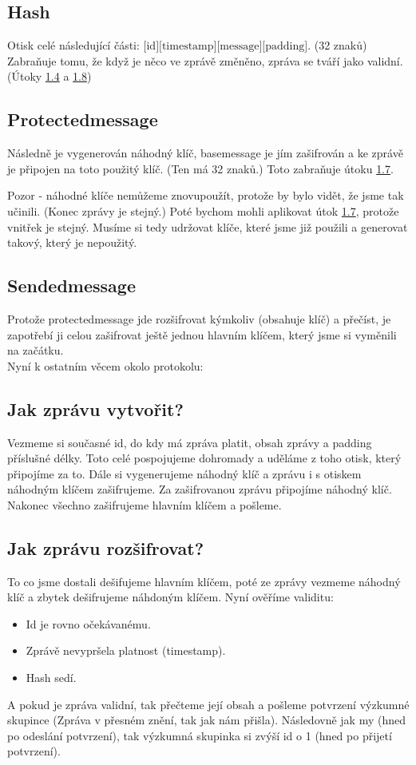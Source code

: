 \documentclass{article}
\begin{document}
\subsection{Hash}
Otisk celé následující části: \(\text{[id][timestamp][message][padding]}\). (32 znaků) Zabraňuje tomu, že když je něco ve zprávě změněno, zpráva se tváří jako validní.
(Útoky \hyperref[1.4]{1.4} a \hyperref[1.8]{1.8})

\subsection{Protectedmessage}
Následně je vygenerován náhodný klíč, basemessage je jím zašifrován a ke zprávě je připojen na toto použitý klíč. (Ten má 32 znaků.) Toto zabraňuje útoku \hyperref[1.7]{1.7}.

Pozor - náhodné klíče nemůžeme znovupoužít, protože by bylo vidět, že jsme tak učinili. (Konec zprávy je stejný.) Poté bychom mohli aplikovat útok \hyperref[1.7]{1.7}, protože vnitřek je stejný.
Musíme si tedy udržovat klíče, které jsme již použili a generovat takový, který je nepoužitý.

\subsection{Sendedmessage}
Protože protectedmessage jde rozšifrovat kýmkoliv (obsahuje klíč) a přečíst, je zapotřebí ji celou zašifrovat ještě jednou hlavním klíčem, který jsme si vyměnili na začátku. \\

Nyní k ostatním věcem okolo protokolu:
\subsection{Jak zprávu vytvořit?}
Vezmeme si současné id, do kdy má zpráva platit, obsah zprávy a padding příslušné délky. Toto celé pospojujeme dohromady a uděláme z toho otisk, který připojíme za to. Dále si vygenerujeme náhodný klíč a zprávu i s otiskem
náhodným klíčem zašifrujeme. Za zašifrovanou zprávu připojíme náhodný klíč. Nakonec všechno zašifrujeme hlavním klíčem a pošleme.

\subsection{Jak zprávu rozšifrovat?}
To co jsme dostali dešifujeme hlavním klíčem, poté ze zprávy vezmeme náhodný klíč a zbytek dešifrujeme náhdoným klíčem. Nyní ověříme validitu:
\begin{itemize}
    \item Id je rovno očekávanému.
    \item Zprávě nevypršela platnost (timestamp).
    \item Hash sedí.
\end{itemize}
A pokud je zpráva validní, tak přečteme její obsah a pošleme potvrzení výzkumné skupince (Zpráva v přesném znění, tak jak nám přišla). Následovně jak my (hned po odeslání potvrzení),
tak výzkumná skupinka si zvýší id o 1 (hned po přijetí potvrzení).
\end{document}
